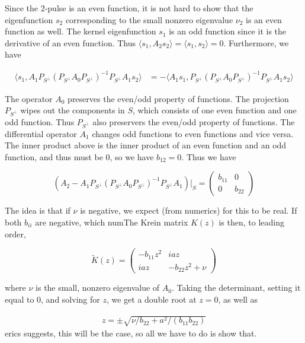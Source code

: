 \documentclass[12pt]{article}
\begin{document}
Since the 2-pulse is an even function, it is not hard to show that the eigenfunction $s_2$ corresponding to the small nonzero eigenvalue $\nu_2$ is an even function as well. The kernel eigenfunction $s_1$ is an odd function since it is the derivative of an even function. Thus $\langle s_1, A_2 s_2 \rangle = \langle s_1, s_2 \rangle = 0$. Furthermore, we have

\begin{align*}
\langle s_1, A_1 P_{S^\perp} (P_{S^\perp} A_0 P_{S^\perp})^{-1} P_{S^\perp} A_1 s_2 \rangle 
&= -\langle A_1 s_1, P_{S^\perp} (P_{S^\perp} A_0 P_{S^\perp})^{-1} P_{S^\perp} A_1 s_2 \rangle 
\end{align*}

The operator $A_0$ preserves the even/odd property of functions. The projection $P_{S^\perp}$ wipes out the components in $S$, which consists of one even function and one odd function. Thus $P_{S^\perp}$ also preservers the even/odd property of functions. The differential operator $A_1$ changes odd functions to even functions and vice versa. The inner product above is the inner product of an even function and an odd function, and thus must be 0, so we have $b_{12} = 0$. Thus we have

\[
\left( A_2 - A_1 P_{S^\perp} (P_{S^\perp} A_0 P_{S^\perp})^{-1} P_{S^\perp} A_1 \right)|_S = \begin{pmatrix} b_{11} & 0 \\ 0 & b_{22} \end{pmatrix}
\]

The idea is that if $\nu$ is negative, we expect (from numerics) for this to be real. If both $b_{ii}$ are negative, which numThe Krein matrix $K(z)$ is then, to leading order,

\begin{equation}
\tilde{K}(z) = \begin{pmatrix}
-b_{11} z^2 & i a z \\
i a z & -b_{22} z^2 + \nu
\end{pmatrix}
\end{equation}

where $\nu$ is the small, nonzero eigenvalue of $A_0$. Taking the determinant, setting it equal to 0, and solving for $z$, we get a double root at $z = 0$, as well as

\begin{align*}
z = \pm \sqrt{\nu /b_{22} + a^2/(b_{11} b_{22})}
\end{align*} erics suggests, this will be the case, so all we have to do is show that.\\
\end{document}
